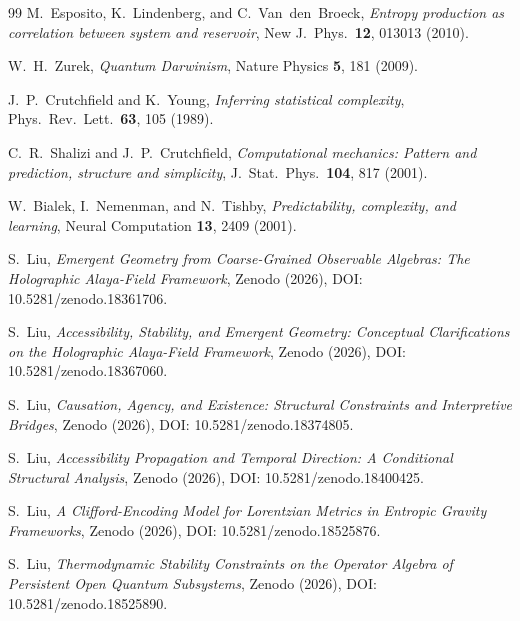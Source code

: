 \documentclass[12pt]{article}
\begin{document}
\begin{thebibliography}{99}
M.~Esposito, K.~Lindenberg, and C.~Van~den~Broeck,
\emph{Entropy production as correlation between system and reservoir},
New J.\ Phys.\ \textbf{12}, 013013 (2010).

W.~H.~Zurek,
\emph{Quantum Darwinism},
Nature Physics \textbf{5}, 181 (2009).

J.~P.~Crutchfield and K.~Young,
\emph{Inferring statistical complexity},
Phys.\ Rev.\ Lett.\ \textbf{63}, 105 (1989).

C.~R.~Shalizi and J.~P.~Crutchfield,
\emph{Computational mechanics: Pattern and prediction, structure and simplicity},
J.\ Stat.\ Phys.\ \textbf{104}, 817 (2001).

W.~Bialek, I.~Nemenman, and N.~Tishby,
\emph{Predictability, complexity, and learning},
Neural Computation \textbf{13}, 2409 (2001).

S.~Liu, \emph{Emergent Geometry from Coarse-Grained Observable Algebras: The Holographic Alaya-Field Framework}, Zenodo (2026), DOI: 10.5281/zenodo.18361706.

S.~Liu, \emph{Accessibility, Stability, and Emergent Geometry: Conceptual Clarifications on the Holographic Alaya-Field Framework}, Zenodo (2026), DOI: 10.5281/zenodo.18367060.

S.~Liu, \emph{Causation, Agency, and Existence: Structural Constraints and Interpretive Bridges}, Zenodo (2026), DOI: 10.5281/zenodo.18374805.

S.~Liu, \emph{Accessibility Propagation and Temporal Direction: A Conditional Structural Analysis}, Zenodo (2026), DOI: 10.5281/zenodo.18400425.

S.~Liu, \emph{A Clifford-Encoding Model for Lorentzian Metrics in Entropic Gravity Frameworks}, Zenodo (2026), DOI: 10.5281/zenodo.18525876.

S.~Liu, \emph{Thermodynamic Stability Constraints on the Operator Algebra of Persistent Open Quantum Subsystems}, Zenodo (2026), DOI: 10.5281/zenodo.18525890.

\end{thebibliography}
\end{document}
